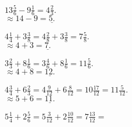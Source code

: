 \documentclass[12pt]{article}
\newenvironment{problem}[2][Problem]{\begin{trivlist}
\item[\hskip \labelsep {\bfseries #1}\hskip \labelsep {\bfseries #2.}]}{\end{trivlist}}
\begin{document}
\begin{problem}{10}
$13 \frac{5}{6} - 9 \frac{1}{6} = \boxed{4 \frac{2}{3}.}$ \\
$\approx 14 - 9 = \underline{5.}$
\end{problem}

\begin{problem}{11}
$4 \frac{1}{4} + 3 \frac{3}{8} = 4 \frac{2}{8} + 3 \frac{3}{8} = \boxed{7 \frac{5}{8}.}$ \\
$\approx 4 + 3 = \underline{7.}$
\end{problem}

\begin{problem}{12}
$3 \frac{2}{3} + 8 \frac{1}{6} = 3 \frac{4}{6} + 8 \frac{1}{6} = \boxed{11 \frac{5}{6}.}$ \\
$\approx 4 + 8 = \underline{12.}$
\end{problem}

\begin{problem}{13}
$4 \frac{3}{4} + 6 \frac{2}{3} = 4 \frac{9}{12} + 6 \frac{8}{12} = 10 \frac{17}{12} = \boxed{11 \frac{5}{12}.}$ \\
$\approx 5 + 6 = \underline{11.}$
\end{problem}

\begin{problem}{14}
$5 \frac{1}{4} + 2 \frac{5}{6} = 5 \frac{3}{12} + 2 \frac{10}{12} = 7 \frac{13}{12} = \boxed{}$
\end{problem}

\begin{problem}{15}

\end{problem}
\end{document}
